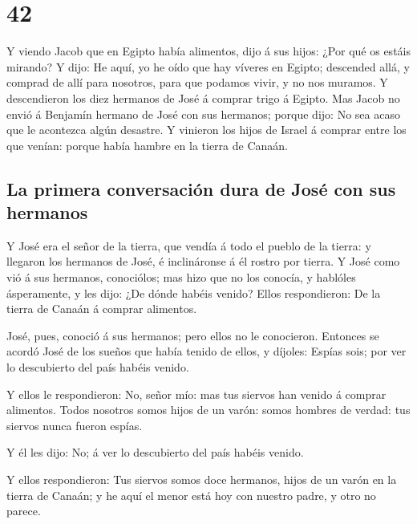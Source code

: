 \hypertarget{section-41}{%
\section{42}\label{section-41}}

 Y viendo Jacob que en Egipto había alimentos, dijo á sus
hijos: ¿Por qué os estáis mirando?  Y dijo: He aquí, yo he
oído que hay víveres en Egipto; descended allá, y comprad de allí para
nosotros, para que podamos vivir, y no nos muramos.  Y
descendieron los diez hermanos de José á comprar trigo á Egipto.
 Mas Jacob no envió á Benjamín hermano de José con sus
hermanos; porque dijo: No sea acaso que le acontezca algún desastre.
 Y vinieron los hijos de Israel á comprar entre los que
venían: porque había hambre en la tierra de Canaán.

\hypertarget{la-primera-conversaciuxf3n-dura-de-josuxe9-con-sus-hermanos}{%
\subsection{La primera conversación dura de José con sus
hermanos}\label{la-primera-conversaciuxf3n-dura-de-josuxe9-con-sus-hermanos}}

 Y José era el señor de la tierra, que vendía á todo el
pueblo de la tierra: y llegaron los hermanos de José, é inclináronse á
él rostro por tierra.  Y José como vió á sus hermanos,
conociólos; mas hizo que no los conocía, y hablóles ásperamente, y les
dijo: ¿De dónde habéis venido? Ellos respondieron: De la tierra de
Canaán á comprar alimentos.

 José, pues, conoció á sus hermanos; pero ellos no le
conocieron.  Entonces se acordó José de los sueños que
había tenido de ellos, y díjoles: Espías sois; por ver lo descubierto
del país habéis venido.

 Y ellos le respondieron: No, señor mío: mas tus siervos
han venido á comprar alimentos.  Todos nosotros somos
hijos de un varón: somos hombres de verdad: tus siervos nunca fueron
espías.

 Y él les dijo: No; á ver lo descubierto del país habéis
venido.

 Y ellos respondieron: Tus siervos somos doce hermanos,
hijos de un varón en la tierra de Canaán; y he aquí el menor está hoy
con nuestro padre, y otro no parece.

